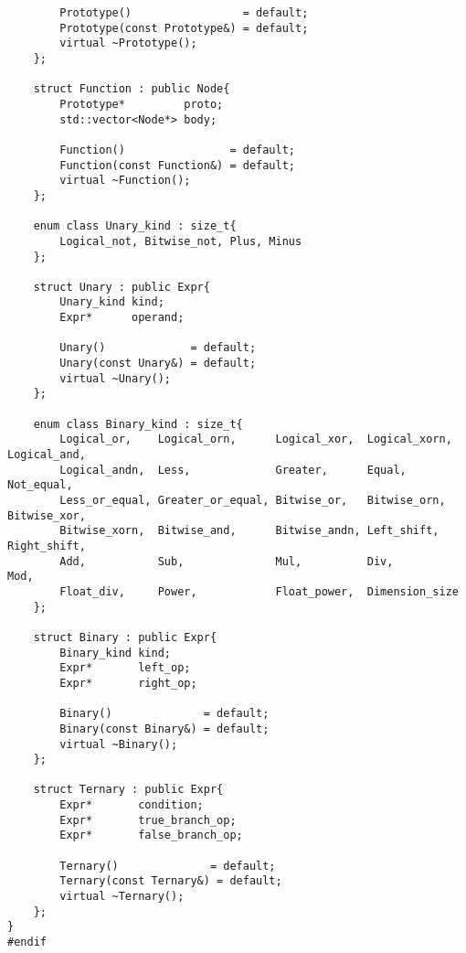 \documentclass[10pt]{article}
\begin{document}
\begin{verbatim}
        Prototype()                 = default;
        Prototype(const Prototype&) = default;
        virtual ~Prototype();
    };
    
    struct Function : public Node{
        Prototype*         proto;
        std::vector<Node*> body;
        
        Function()                = default;
        Function(const Function&) = default;
        virtual ~Function();
    };
    
    enum class Unary_kind : size_t{
        Logical_not, Bitwise_not, Plus, Minus
    };
    
    struct Unary : public Expr{
        Unary_kind kind;
        Expr*      operand;    
        
        Unary()             = default;
        Unary(const Unary&) = default;
        virtual ~Unary();
    };
    
    enum class Binary_kind : size_t{
        Logical_or,    Logical_orn,      Logical_xor,  Logical_xorn,  Logical_and,   
        Logical_andn,  Less,             Greater,      Equal,         Not_equal,    
        Less_or_equal, Greater_or_equal, Bitwise_or,   Bitwise_orn,   Bitwise_xor,
        Bitwise_xorn,  Bitwise_and,      Bitwise_andn, Left_shift,    Right_shift,
        Add,           Sub,              Mul,          Div,           Mod,
        Float_div,     Power,            Float_power,  Dimension_size
    };
    
    struct Binary : public Expr{
        Binary_kind kind;
        Expr*       left_op;    
        Expr*       right_op;
        
        Binary()              = default;
        Binary(const Binary&) = default;
        virtual ~Binary();
    };
    
    struct Ternary : public Expr{
        Expr*       condition;
        Expr*       true_branch_op;    
        Expr*       false_branch_op;
        
        Ternary()              = default;
        Ternary(const Ternary&) = default;
        virtual ~Ternary();
    };
}
#endif
\end{verbatim}
\end{document}
